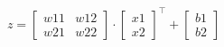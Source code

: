 \documentclass[preview]{standalone}
\begin{document}
\begin{align*}
z = \begin{bmatrix} w{11} & w{12} \\ w{21} & w{22} \end{bmatrix} \cdot \begin{bmatrix} x1 \\ x2 \end{bmatrix}^\top + \begin{bmatrix} b1 \\ b2 \end{bmatrix}
\end{align*}
\end{document}
